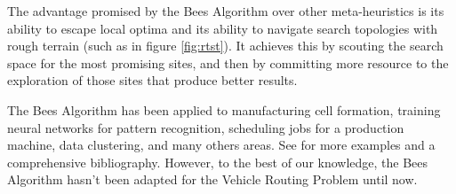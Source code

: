 The advantage promised by the Bees Algorithm over other meta-heuristics is its ability to escape local optima and its ability to navigate search topologies with rough terrain (such as in figure \ref{fig:rtst}). It achieves this by scouting the search space for the most promising sites, and then by committing more resource to the exploration of those sites that produce better results.


The Bees Algorithm has been applied to manufacturing cell formation, training neural networks for pattern recognition, scheduling jobs for a production machine, data clustering, and many others areas. See \cite{beesalg} for more examples and a comprehensive bibliography. However, to the best of our knowledge, the Bees Algorithm hasn't been adapted for the Vehicle Routing Problem until now.
